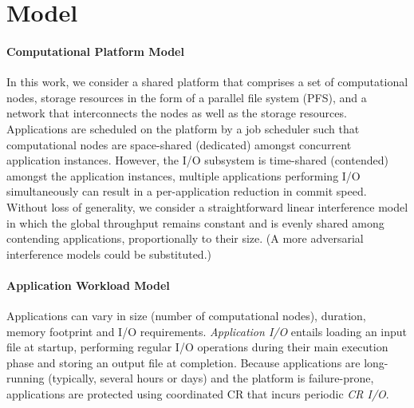
\section{Model}
\label{sec:model}

\paragraph*{Computational Platform Model}
In this work, we consider a shared platform that comprises a set of computational
nodes, storage resources in the form of a parallel file system (PFS), and a network
that interconnects the nodes as well as the storage resources. Applications are
scheduled on the platform by a job scheduler such that computational nodes are
space-shared (dedicated) amongst concurrent application instances. However, the I/O
subsystem is time-shared (contended) amongst the application instances, \ie multiple
applications performing I/O simultaneously can result in a per-application reduction
in commit speed. Without loss of generality, we consider a straightforward linear
interference model in which the global throughput remains constant and is evenly
shared among contending applications, proportionally to their size.
(A more adversarial interference models could be substituted.)

\paragraph*{Application Workload Model}
Applications can vary in size (number of computational nodes), duration, memory
footprint and I/O requirements.  \emph{Application I/O} entails loading an input file
at startup, performing regular I/O operations during their main execution phase and
storing an output file at completion. Because applications are long-running
(typically, several hours or days) and the platform is failure-prone, applications
are protected using coordinated CR that incurs periodic \emph{CR I/O}.

